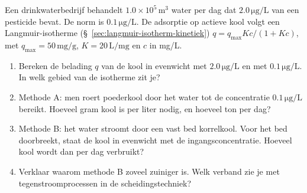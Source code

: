 \begin{oefening}\label{oef:actieve-kool}
Een drinkwaterbedrijf behandelt \(1.0\times10^{5}\,\mathrm{m^3}\) water per dag dat \(2.0\,\mathrm{\mu g/L}\) van een pesticide bevat. De norm is \(0.1\,\mathrm{\mu g/L}\). De adsorptie op actieve kool volgt een Langmuir-isotherme (\S~\ref{sec:langmuir-isotherm-kinetiek}) \(q = q_{\max}Kc/(1 + Kc)\), met \(q_{\max} = 50\,\mathrm{mg/g}\), \(K = 20\,\mathrm{L/mg}\) en \(c\) in mg/L.

\begin{enumerate}
\item[(a)]
  Bereken de belading \(q\) van de kool in evenwicht met \(2.0\,\mathrm{\mu g/L}\) en met \(0.1\,\mathrm{\mu g/L}\). In welk gebied van de isotherme zit je?
\item[(b)]
  Methode A: men roert poederkool door het water tot de concentratie \(0.1\,\mathrm{\mu g/L}\) bereikt. Hoeveel gram kool is per liter nodig, en hoeveel ton per dag?
\item[(c)]
  Methode B: het water stroomt door een vast bed korrelkool. Voor het bed doorbreekt, staat de kool in evenwicht met de ingangsconcentratie. Hoeveel kool wordt dan per dag verbruikt?
\item[(d)]
  Verklaar waarom methode B zoveel zuiniger is. Welk verband zie je met tegenstroomprocessen in de scheidingstechniek?
\end{enumerate}
\end{oefening}
